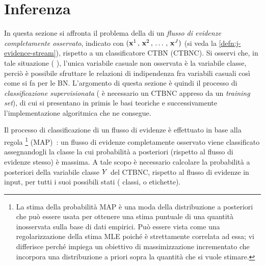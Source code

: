 \cleardoublepage
\section{Inferenza}\label{sec:inference-ctbnc}
In questa sezione si affronta il problema della \emph{} di un \emph{flusso di evidenze completamente osservato}, indicato con $(\mathbf{x}^1\,,\,\mathbf{x}^2\,,\,\dotsc\,,\,\mathbf{x}^{J})$ (si veda la \autoref{defn:j-evidence-stream}), rispetto a un classificatore \acs{CTBN} (\acs{CTBNC}). Si osservi che, in tale situazione (\ie{} \emph{}), l'unica variabile casuale non osservata è la variabile classe, perciò è possibile sfruttare le relazioni di indipendenza fra variabili casuali così come si fa per le \acl{BN}. L'argomento di questa sezione è quindi il processo di \emph{classificazione supervisionata} (\ie{} è necessario un \acs{CTBNC} appreso da un \emph{training set}), di cui si presentano in primis le basi teoriche e successivamente l'implementazione algoritmica che ne consegue.

Il processo di classificazione di un flusso di evidenze è effettuato in base alla regola \emph{}\footnote{La stima della probabilità \acf{MAP} è una moda della distribuzione a posteriori che può essere usata per ottenere una stima puntuale di una quantità inosservata sulla base di dati empirici. Può essere vista come una regolarizzazione della stima \acf{MLE} poiché è strettamente correlata ad essa; vi differisce perché impiega un obiettivo di massimizzazione incrementato che incorpora una distribuzione a priori sopra la quantità che si vuole stimare.} (\acs{MAP})~\citep[si veda][]{Stella2012}: un flusso di evidenze completamente osservato viene classificato assegnandogli la classe la cui probabilità a posteriori (rispetto al flusso di evidenze stesso) è massima. A tale scopo è necessario calcolare la probabilità a posteriori della variabile classe $\mathnormal{Y}$ del \acs{CTBNC}, rispetto al flusso di evidenze in input, per tutti i suoi possibili stati (\ie{} classi, o etichette).

